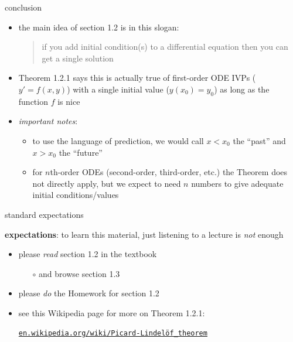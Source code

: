 \documentclass{beamer}
\begin{document}
\begin{frame}{conclusion}

\begin{itemize}
\item the main idea of section 1.2 is in this slogan:

\bigskip

\begin{quote}
\alert{if you add initial condition(s) to a differential equation then you can get a single solution}
\end{quote}

\bigskip

\item Theorem 1.2.1 says this is actually true of first-order ODE IVPs ($y'=f(x,y)$) with a single initial value ($y(x_0)=y_0$) as long as the function $f$ is nice
\item \emph{important notes}:
    \begin{itemize}
    \item to use the language of prediction, we would call $x<x_0$ the ``past'' and $x>x_0$ the ``future''
    \item for $n$th-order ODEs (second-order, third-order, etc.) the Theorem does not directly apply, but we expect to need $n$ numbers to give adequate initial conditions/values
    \end{itemize}
\end{itemize}
\end{frame}


\begin{frame}{standard expectations}

\textbf{expectations}:  to learn this material, just listening to a lecture is \emph{not} enough
\begin{itemize}
\item please \alert{\emph{read} section 1.2 in the textbook}
    \begin{itemize}
    \item[$\circ$] and browse section 1.3
    \end{itemize}
\item please \alert{\emph{do} the Homework for section 1.2}
\item see this Wikipedia page for more on Theorem 1.2.1:

\centerline{\href{https://en.wikipedia.org/wiki/Picard-Lindelof_theorem}{\texttt{en.wikipedia.org/wiki/Picard-Lindel\"of\_theorem}}}
\end{itemize}
\end{frame}
\end{document}
